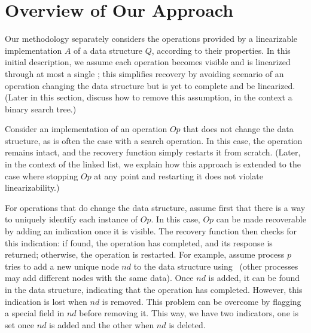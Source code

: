 \section{Overview of Our Approach}

Our methodology separately considers the operations provided by
a linearizable implementation $A$ of a data structure $Q$,
according to their properties.
In this initial description, we assume each operation becomes
visible and is linearized through at most a single \CAS;
this simplifies recovery by avoiding scenario of an
operation changing the data structure but is yet to complete
and be linearized.
(Later in this section, discuss how to remove this assumption,
in the context a binary search tree.)

Consider an implementation of an operation $Op$ that does not change
the data structure, as is often the case with a search operation.
In this case, the operation remains intact, and the recovery
function simply restarts it from scratch.
(Later, in the context of the linked list, we explain how this
approach is extended to the case where stopping $Op$ at any point
and restarting it does not violate linearizability.)

For operations that do change the data structure, assume first that
there is a way to uniquely identify each instance of $Op$.
In this case, $Op$ can be made recoverable by adding an indication
once it is visible.
The recovery function then checks for this indication:
if found, the operation has completed, and its response is returned;
otherwise, the operation is restarted.
For example, assume process $p$ tries to add a new unique node $nd$
to the data structure using \CAS\
(other processes may add different nodes with the same data).
Once $nd$ is added, it can be found in the data structure,
indicating that the operation has completed.
However, this indication is lost when $nd$ is removed.
This problem can be overcome by flagging a special field in $nd$ before
removing it.
This way, we have two indicators,
one is set once $nd$ is added and the other when $nd$ is deleted.

